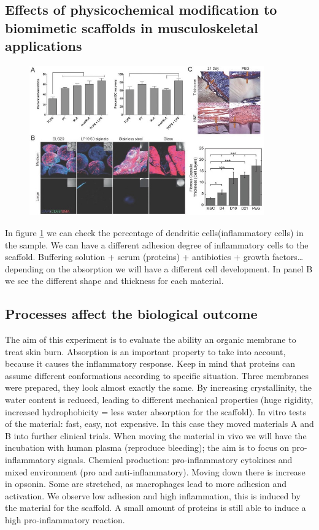 \subsection{Effects of physicochemical modification to biomimetic scaffolds in musculoskeletal applications}
\begin{figure}[ht]
\includegraphics[width=0.9\textwidth]{muscosk}
\caption{\label{fig:muscosk}}
\end{figure}
In figure \ref{fig:muscosk} we can check the percentage of dendritic cells(inflammatory cells) in the sample. 
We can have a different adhesion degree of inflammatory cells to the scaffold. 
Buffering solution + serum (proteins) + antibiotics + growth factors…depending on the absorption we will have a different cell development. 
In panel B we see the different shape and thickness for each material.

\subsection{Processes affect the biological outcome}
The aim of this experiment is to evaluate the ability an organic membrane to treat skin burn. Absorption is an important property to take into account, because it causes the inflammatory response. 
Keep in mind that proteins can assume different conformations according to specific situation. Three membranes were prepared, they look almost exactly the same. 
By increasing crystallinity, the water content is reduced,  leading to different mechanical properties (huge rigidity, increased hydrophobicity = less water absorption for the scaffold). 
In vitro tests of the material: fast, easy, not expensive. 
In this case they moved materials A and B into further clinical trials. When moving the material in vivo we will have the incubation with human plasma (reproduce bleeding); the aim is to focus on pro-inflammatory signals.
Chemical production: pro-inflammatory cytokines and mixed environment (pro and anti-inflammatory). Moving down there is increase in opsonin.  Some are stretched, as macrophages lead to more adhesion and activation. 
We observe low adhesion and high inflammation, this is induced by the material for the scaffold. A small amount of proteins is still able to induce a high pro-inflammatory reaction. 

